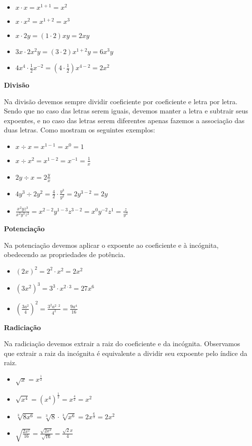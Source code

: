   \begin{itemize}
   \item $x \cdot x = x^{1+1}= x^2$
   \item $x \cdot x^2= x^{1+2}= x^3$
   \item $x \cdot 2y= (1 \cdot 2)xy= 2xy$
   \item $3x \cdot 2x^2y= (3 \cdot 2)x^{1+2}y= 6x^3y$
   \item $4x^4 \cdot \frac{1}{2}x^{-2}= (4 \cdot \frac{1}{2})x^{4-2}= 2x^2$
  \end{itemize}

  \vskip0.3cm

   \textbf{Divisão}

   Na divisão devemos sempre dividir coeficiente por coeficiente e letra por letra. Sendo que no caso das letras serem iguais, devemos manter a letra e subtrair seus expoentes, e no caso das letras serem diferentes apenas fazemos a associação das duas letras. Como mostram os seguintes exemplos:

  \begin{itemize}
   \item $x \div x= x^{1-1}= x^0= 1$
   \item $x \div x^2= x^{1-2}= x^{-1}= \frac{1}{x}$
   \item $2y \div x= 2\frac{y}{x}$
   \item $4y^3 \div 2y^2= \frac{4}{2} \cdot \frac{y^3}{y^2}= 2y^{3-2}= 2y$
   \item $\frac{x^2yz^3}{x^2y^3z^2}= x^{2-2}y^{1-3}z^{3-2}= x^0 y^{-2}z^{1}= \frac{z}{y^2}$
  \end{itemize}

 \vskip0.3cm

  \textbf{Potenciação}

  Na potenciação devemos aplicar o expoente ao coeficiente e à incógnita, obedecendo as propriedades de potência.

    \begin{itemize}
     \item $(2x)^2= 2^2 \cdot x^2= 2x^2$
     \item $(3x^2)^3= 3^3 \cdot x^{2\cdot 3}= 27x^6$
     \item $\left(\frac{3a^2}{4}\right)^2= \frac{3^2 a^{2 \cdot 2}}{4^2}= \frac{9a^4}{16}$
    \end{itemize}

  \vskip0.3cm

  \textbf{Radiciação}

  Na radiciação devemos extrair a raiz do coeficiente e da incógnita. Observamos que extrair a raiz da incógnita é equivalente a dividir seu expoente pelo índice da raiz.
    \begin{itemize}
     \item $\sqrt{x}= x^{\frac{1}{2}}$
     \item $\sqrt{x^4}= (x^4)^{\frac{1}{2}}= x^{\frac{4}{2}}= x^2$
     \item $\sqrt[3]{8x^6}= \sqrt[3]{8} \cdot \sqrt[3]{x^6}= 2 x^{\frac{6}{3}}= 2x^2$
     \item $\sqrt{\frac{2x^2}{16}}= \frac{\sqrt{2x^2}}{\sqrt{16}}= \frac{\sqrt{2}x}{4}$
    \end{itemize}

